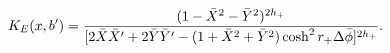 \begin{equation}
K_E(x,b') = {(1-\bar X^2 - \bar Y^2)^{2h_+} \over [2\bar X \bar X'
    + 2 \bar Y \bar Y' - (1 + \bar X^2 + \bar Y^2) \cosh^2
    r_+ \Delta \bar \phi ]^{2h_+}}.
\end{equation}

